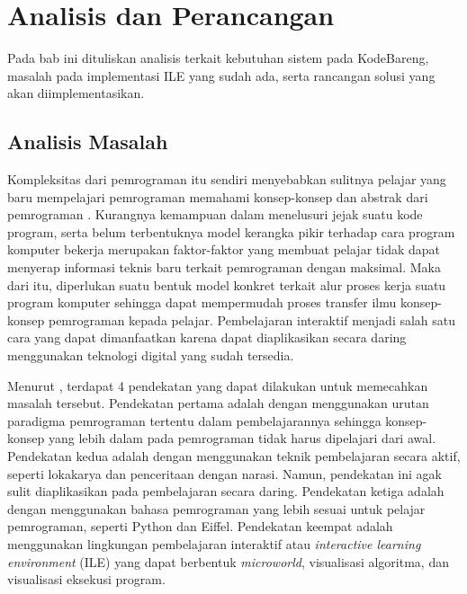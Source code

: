 \chapter{Analisis dan Perancangan}
Pada bab ini dituliskan analisis terkait kebutuhan sistem pada KodeBareng, masalah pada implementasi ILE yang sudah ada, serta rancangan solusi yang akan diimplementasikan.

\section{Analisis Masalah}


Kompleksitas dari pemrograman itu sendiri menyebabkan sulitnya pelajar yang baru mempelajari pemrograman memahami konsep-konsep dan abstrak dari pemrograman \parencite{moons2013pilot}. Kurangnya kemampuan dalam menelusuri jejak suatu kode program, serta belum terbentuknya model kerangka pikir terhadap cara program komputer bekerja \parencite{mayer1981psychology} merupakan faktor-faktor yang membuat pelajar tidak dapat menyerap informasi teknis baru terkait pemrograman dengan maksimal. Maka dari itu, diperlukan suatu bentuk model konkret terkait alur proses kerja suatu program komputer sehingga dapat mempermudah proses transfer ilmu konsep-konsep pemrograman kepada pelajar. Pembelajaran interaktif menjadi salah satu cara yang dapat dimanfaatkan karena dapat diaplikasikan secara daring menggunakan teknologi digital yang sudah tersedia.

Menurut \textcite{moons2013pilot}, terdapat 4 pendekatan yang dapat dilakukan untuk memecahkan masalah tersebut. Pendekatan pertama adalah dengan menggunakan urutan paradigma pemrograman tertentu dalam pembelajarannya sehingga konsep-konsep yang lebih dalam pada pemrograman tidak harus dipelajari dari awal. Pendekatan kedua adalah dengan menggunakan teknik pembelajaran secara aktif, seperti lokakarya dan penceritaan dengan narasi. Namun, pendekatan ini agak sulit diaplikasikan pada pembelajaran secara daring. Pendekatan ketiga adalah dengan menggunakan bahasa pemrograman yang lebih sesuai untuk pelajar pemrograman, seperti Python dan Eiffel. Pendekatan keempat adalah menggunakan lingkungan pembelajaran interaktif atau \textit{interactive learning environment} (ILE) yang dapat berbentuk \textit{microworld}, visualisasi algoritma, dan visualisasi eksekusi program.

